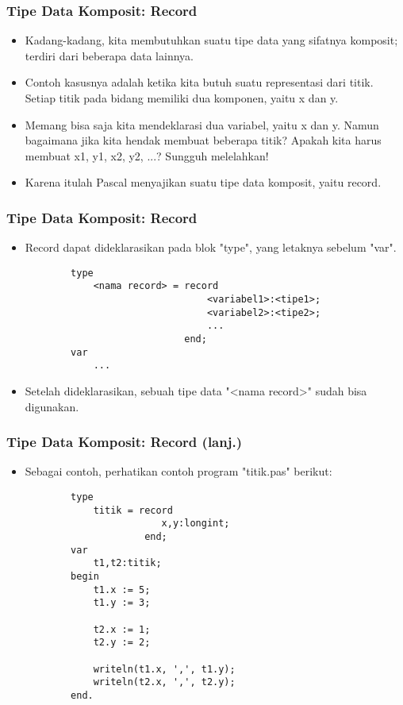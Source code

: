 \documentclass{beamer}
\begin{document}
\begin{frame}
\frametitle{Tipe Data Komposit: Record}
\begin{itemize}
	\item Kadang-kadang, kita membutuhkan suatu tipe data yang sifatnya komposit; terdiri dari beberapa data lainnya.
	\item Contoh kasusnya adalah ketika kita butuh suatu representasi dari titik. Setiap titik pada bidang memiliki dua komponen, yaitu x dan y.
	\item Memang bisa saja kita mendeklarasi dua variabel, yaitu x dan y. Namun bagaimana jika kita hendak membuat beberapa titik? Apakah kita harus membuat x1, y1, x2, y2, ...? Sungguh melelahkan!
	\item Karena itulah Pascal menyajikan suatu tipe data komposit, yaitu \alert{record}. 
\end{itemize}
\end{frame}

\begin{frame}[fragile]
\frametitle{Tipe Data Komposit: Record}
\begin{itemize}
	\item Record dapat dideklarasikan pada blok "type", yang letaknya sebelum "var".
	\begin{lstlisting}
		type
		    <nama record> = record
		                        <variabel1>:<tipe1>;
		                        <variabel2>:<tipe2>;
		                        ...
		                    end;
		var
		    ...
	\end{lstlisting}
	\item Setelah dideklarasikan, sebuah tipe data "<nama record>" sudah bisa digunakan.
\end{itemize}
\end{frame}

\begin{frame}[fragile]
\frametitle{Tipe Data Komposit: Record (lanj.)}
\begin{itemize}
	\item Sebagai contoh, perhatikan contoh program "titik.pas" berikut:
	\begin{lstlisting}
		type
		    titik = record
		                x,y:longint;
		             end;
		var
		    t1,t2:titik;
		begin
		    t1.x := 5;
		    t1.y := 3;
		
		    t2.x := 1;
		    t2.y := 2;
		
		    writeln(t1.x, ',', t1.y);
		    writeln(t2.x, ',', t2.y);
		end.
	\end{lstlisting}
\end{itemize}
\end{frame}
\end{document}
